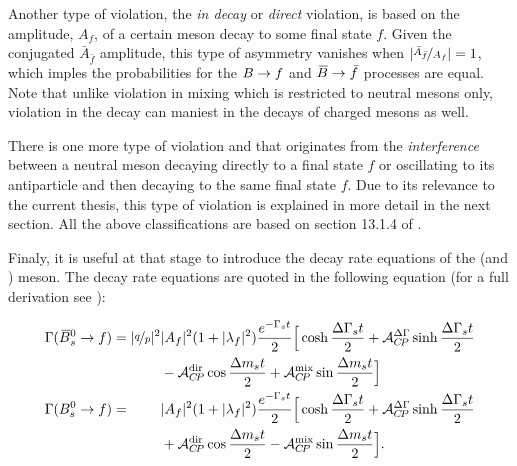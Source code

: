 Another type of \CP violation, the {\it in decay} or {\it direct} \CP violation, is based on the
amplitude, $A_f$, of a certain meson decay to some final state $f$. Given the \CP conjugated $\bar{A}_{\bar{f}}$
amplitude, this type of \CP asymmetry vanishes when $|\nicefrac{\bar{A}_{\bar{f}}}{A_f}| = 1$,
which imples the probabilities for the $B \rightarrow f$ and $\kern 0.18em\overline{\kern -0.18em B}{} \rightarrow \bar{f}$ processes are equal.
Note that unlike \CP violation in mixing which is restricted to neutral mesons only,
\CP violation in the decay can maniest in the decays of charged mesons as well.

There is one more type of \CP violation and that originates from the {\it interference} between
a neutral meson decaying directly to a final state $f$ or oscillating to its antiparticle and then decaying
to the same final state $f$. Due to its relevance to the current thesis, this type of \CP violation is explained
in more detail in the next section. All the above classifications are based on section 13.1.4 of \cite{PDG}.

Finaly, it is useful at that stage to introduce the decay rate equations of the \Bs (and \Bsb) meson.
The decay rate equations are quoted in the following equation (for a full derivation see \cite{PDG,DeBruyn-thesis,jeroenThesis}):

\newcommand{\ampSq}{\ensuremath{|A_f|^2}\xspace}
\newcommand{\ampBSq}{\ensuremath{|\bar{A}_f|^2}\xspace}
\newcommand{\lambSq}{\ensuremath{|\lambda_f|^2}\xspace}
\newcommand{\eGammast}{\ensuremath{e^{-\Gamma_s t}}\xspace}
\newcommand{\qopSq}{\ensuremath{|\qoverp|^2}\xspace}
\newcommand{\DeltaGammat}{\ensuremath{\frac{\Delta\Gamma_s t}{2}}\xspace}
\newcommand{\DeltaMt}{\ensuremath{\frac{\Delta m_s t}{2}}\xspace}

\begin{subequations}
 \label{decay_rate_master_eqs}
 \begin{align}
 \centering
    \Gamma(\Bsb \to f) =          \qopSq & \ampSq (1+\lambSq) \frac{\eGammast}{2} \Big[ \cosh\DeltaGammat + \Acp{\Delta\Gamma}\sinh\DeltaGammat \nonumber \\
                                         &  - \Acp{\rm dir}\cos\DeltaMt + \Acp{\rm mix}\sin\DeltaMt \Big]  \\
    \Gamma(\Bs \to f) = \phantom{\qopSq} & \ampSq (1+\lambSq) \frac{\eGammast}{2} \Big[ \cosh\DeltaGammat + \Acp{\Delta\Gamma}\sinh\DeltaGammat \nonumber  \\
                                         & + \Acp{\rm dir}\cos\DeltaMt - \Acp{\rm mix}\sin\DeltaMt \Big].
 \end{align}
\end{subequations}

